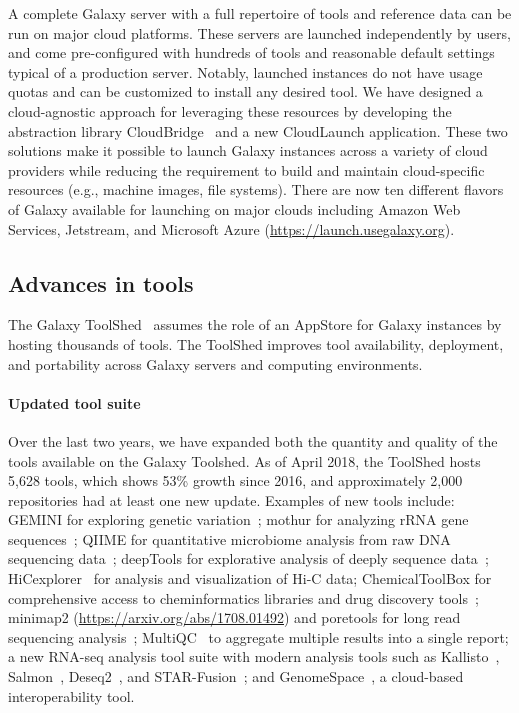 A complete Galaxy server with a full repertoire of tools and reference data can be run on major cloud platforms. These servers are launched independently by users, and come pre-configured with hundreds of tools and reasonable default settings typical of a production server. Notably, launched instances do not have usage quotas and can be customized to install any desired tool. We have designed a cloud-agnostic approach for leveraging these resources by developing the abstraction library CloudBridge~\cite{goonasekera2016cloudbridge} and a new CloudLaunch application. These two solutions make it possible to launch Galaxy instances across a variety of cloud providers while reducing the requirement to build and maintain cloud-specific resources (e.g., machine images, file systems). There are now ten different flavors of Galaxy available for launching on major clouds including Amazon Web Services, Jetstream, and Microsoft Azure (\url{https://launch.usegalaxy.org}).

\subsection*{Advances in tools}
The Galaxy ToolShed~\cite{blankenberg2014dissemination} assumes the role of an AppStore for Galaxy instances by hosting thousands of tools. The ToolShed improves tool availability, deployment, and portability across Galaxy servers and computing environments.

\paragraph*{Updated tool suite} Over the last two years, we have expanded both the quantity and quality of the tools available on the Galaxy Toolshed. As of April 2018, the ToolShed hosts 5,628 tools, which shows 53\% growth since 2016, and approximately 2,000 repositories had at least one new update. Examples of new tools include: GEMINI for exploring genetic variation~\cite{paila2013gemini}; mothur for analyzing rRNA gene sequences~\cite{schloss2009introducing}; QIIME for quantitative microbiome analysis from raw DNA sequencing data~\cite{caporaso2010qiime}; deepTools for explorative analysis of deeply sequence data~\cite{ramirez2014deeptools,ramirez2016deeptools2}; HiCexplorer~\cite{ramirez2018high} for analysis and visualization of Hi-C data; ChemicalToolBox for comprehensive access to cheminformatics libraries and drug discovery tools~\cite{lucas2014chemicaltoolbox}; minimap2 (\url{https://arxiv.org/abs/1708.01492}) and poretools for long read sequencing analysis~\cite{loman2014poretools}; MultiQC~\cite{ewels2016multiqc} to aggregate multiple results into a single report; a new RNA-seq analysis tool suite with modern analysis tools such as Kallisto~\cite{bray2016near}, Salmon~\cite{patro2017salmon}, Deseq2~\cite{love2014moderated}, and STAR-Fusion~\cite{dobin2013star}; and GenomeSpace~\cite{qu2016integrative}, a cloud-based interoperability tool.

